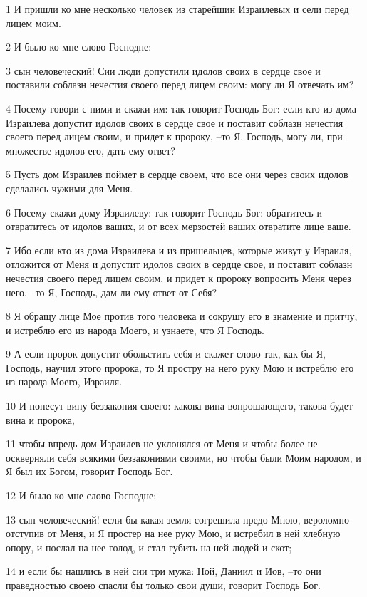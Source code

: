 \par 1 И пришли ко мне несколько человек из старейшин Израилевых и сели перед лицем моим.
\par 2 И было ко мне слово Господне:
\par 3 сын человеческий! Сии люди допустили идолов своих в сердце свое и поставили соблазн нечестия своего перед лицем своим: могу ли Я отвечать им?
\par 4 Посему говори с ними и скажи им: так говорит Господь Бог: если кто из дома Израилева допустит идолов своих в сердце свое и поставит соблазн нечестия своего перед лицем своим, и придет к пророку, --то Я, Господь, могу ли, при множестве идолов его, дать ему ответ?
\par 5 Пусть дом Израилев поймет в сердце своем, что все они через своих идолов сделались чужими для Меня.
\par 6 Посему скажи дому Израилеву: так говорит Господь Бог: обратитесь и отвратитесь от идолов ваших, и от всех мерзостей ваших отвратите лице ваше.
\par 7 Ибо если кто из дома Израилева и из пришельцев, которые живут у Израиля, отложится от Меня и допустит идолов своих в сердце свое, и поставит соблазн нечестия своего перед лицем своим, и придет к пророку вопросить Меня через него, --то Я, Господь, дам ли ему ответ от Себя?
\par 8 Я обращу лице Мое против того человека и сокрушу его в знамение и притчу, и истреблю его из народа Моего, и узнаете, что Я Господь.
\par 9 А если пророк допустит обольстить себя и скажет слово так, как бы Я, Господь, научил этого пророка, то Я простру на него руку Мою и истреблю его из народа Моего, Израиля.
\par 10 И понесут вину беззакония своего: какова вина вопрошающего, такова будет вина и пророка,
\par 11 чтобы впредь дом Израилев не уклонялся от Меня и чтобы более не оскверняли себя всякими беззакониями своими, но чтобы были Моим народом, и Я был их Богом, говорит Господь Бог.
\par 12 И было ко мне слово Господне:
\par 13 сын человеческий! если бы какая земля согрешила предо Мною, вероломно отступив от Меня, и Я простер на нее руку Мою, и истребил в ней хлебную опору, и послал на нее голод, и стал губить на ней людей и скот;
\par 14 и если бы нашлись в ней сии три мужа: Ной, Даниил и Иов, --то они праведностью своею спасли бы только свои души, говорит Господь Бог.
